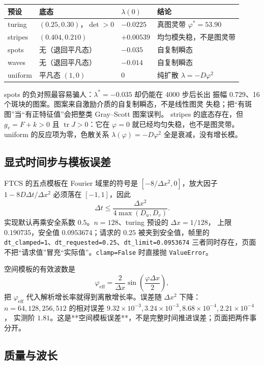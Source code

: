 \begin{center}
\begin{tabular}{llll}
\toprule
预设 & 底态 & $\lambda(0)$ & 结论 \\
\midrule
turing & $(0.25,0.30)$，$\det>0$ & $-0.0225$ & 真图灵带 $\varphi^\ast=53.90$ \\
stripes & $(0.404,0.210)$ & $+0.00539$ & 均匀模失稳，不是图灵带 \\
spots & 无（退回平凡态） & $-0.035$ & 自复制瞬态 \\
waves & 无（退回平凡态） & $-0.014$ & 自复制瞬态 \\
uniform & 平凡态 $(1,0)$ & $0$ & 纯扩散 $\lambda=-D\varphi^2$ \\
\bottomrule
\end{tabular}
\end{center}

spots 的负对照最容易骗人：$\lambda^\ast=-0.035$ 却仍能在 4000 步后长出
振幅 $0.729$、16 个斑块的图案。图案来自激励介质的自复制瞬态，不是线性图灵
失稳；把“有斑图”当“有正特征值”会把整类 Gray--Scott 图案误判。
stripes 的底态存在，但 $g_v=F+k>0$ 且 $\operatorname{tr}J>0$：它在 $\varphi=0$
就已经均匀失稳，也不是图灵带。uniform 的反应项为零，色散关系
$\lambda(\varphi)=-D\varphi^2$ 全是衰减，没有增长模。

\subsection{显式时间步与模板误差}

FTCS 的五点模板在 Fourier 域里的符号是 $[-8/\Delta x^2,0]$，放大因子
$1-8D\Delta t/\Delta x^2$ 必须落在 $[-1,1]$，因此
\[
  \Delta t\le\frac{\Delta x^2}{4\max(D_u,D_v)}.
\]
实现默认再乘安全系数 $0.5$。$n=128$、turing 预设的 $\Delta x=1/128$，
上限 $0.190735$，安全值 $0.0953674$；请求的 $0.25$ 被夹到安全值，帧里的
\texttt{dt\_clamped=1}、\texttt{dt\_requested=0.25}、\texttt{dt\_limit=0.0953674} 三者同时存在，页面
不把“请求值”冒充“实际值”。\texttt{clamp=False} 时直接抛 \texttt{ValueError}。

空间模板的有效波数是
\[
  \varphi_{\text{eff}}=\frac{2}{\Delta x}\sin\left(\frac{\varphi\Delta x}{2}\right),
\]
把 $\varphi_{\text{eff}}$ 代入解析增长率就得到离散增长率。误差随 $\Delta x^2$
下降：$n=64,128,256,512$ 的相对误差
$9.32\times10^{-3},3.24\times10^{-3},8.68\times10^{-4},2.21\times10^{-4}$，
实测阶 $1.81$。这是**空间模板误差**，不是完整时间推进误差；页面把两件事分开。

\subsection{质量与波长}

